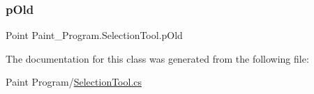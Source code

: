 \mbox{\label{class_paint___program_1_1_selection_tool_ad9d0cc8becec7128bf025fb17d957a90}} 
\subsubsection{\texorpdfstring{p\+Old}{pOld}}
{\footnotesize\ttfamily Point Paint\+\_\+\+Program.\+Selection\+Tool.\+p\+Old\hspace{0.3cm}{\ttfamily [private]}}



The documentation for this class was generated from the following file\+:\begin{DoxyCompactItemize}
\item 
Paint Program/\mbox{\hyperlink{_selection_tool_8cs}{Selection\+Tool.\+cs}}\end{DoxyCompactItemize}
